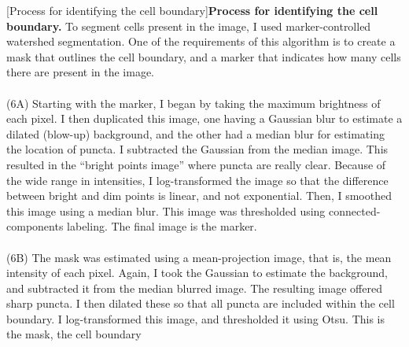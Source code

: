 \begin{centering}
\captionsetup{parbox=none}
[Process for identifying the cell boundary]{\textbf{Process for identifying the cell boundary.} To segment cells present in the image, I used marker-controlled watershed segmentation. One of the requirements of this algorithm is to create a mask that outlines the cell boundary, and a marker that indicates how many cells there are present in the image.
\\
\\
(6A) Starting with the marker, I began by taking the maximum brightness of each pixel. I then duplicated this image, one having a Gaussian blur to estimate a dilated (blow-up) background, and the other had a median blur for estimating the location of puncta. I subtracted the Gaussian from the median image. This resulted in the “bright points image” where puncta are really clear. Because of the wide range in intensities, I log-transformed the image so that the difference between bright and dim points is linear, and not exponential. Then, I smoothed this image using a median blur. This image was thresholded using connected-components labeling. The final image is the marker.
\\
\\
(6B) The mask was estimated using a mean-projection image, that is, the mean intensity of each pixel. Again, I took the Gaussian to estimate the background, and subtracted it from the median blurred image. The resulting image offered sharp puncta. I then dilated these so that all puncta are included within the cell boundary. I log-transformed this image, and thresholded it using Otsu. This is the mask, the cell boundary}
\label{m:S4}
\end{centering}

